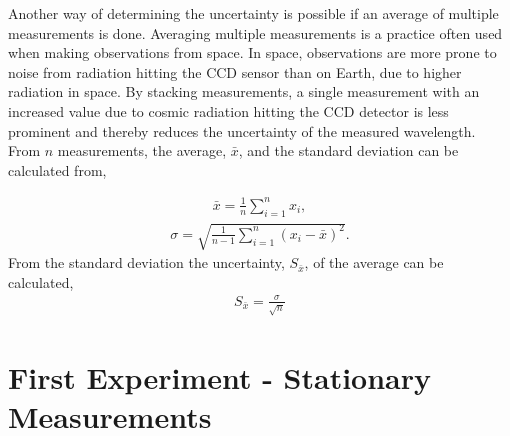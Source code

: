 Another way of determining the uncertainty is possible if an average of multiple measurements is done. Averaging multiple measurements is a practice often used when making observations from space. In space, observations are more prone to noise from radiation hitting the CCD sensor than on Earth, due to higher radiation in space. By stacking measurements, a single measurement with an increased value due to cosmic radiation hitting the CCD detector is less prominent and thereby reduces the uncertainty of the measured wavelength.
From $n$ measurements, the average, $\bar{x}$, and the standard deviation can be calculated from,

\begin{align}
\bar{x} = \frac{1}{n} \sum^{n}_{i=1}x_i,
\label{eq: avg}
\end{align}
\begin{align}
\sigma = \sqrt{\frac{1}{n-1} \sum_{i=1}^{n} (	x_i-\bar{x} )^2}.
\label{eq: std}
\end{align}
From the standard deviation the uncertainty, $S_{\bar{x} }$, of the average can be calculated,
\begin{align}
S_{\bar{x} } = \frac{\sigma}{\sqrt{n}} 
\label{eq: Sx}
\end{align}

\section{First Experiment - Stationary Measurements}

